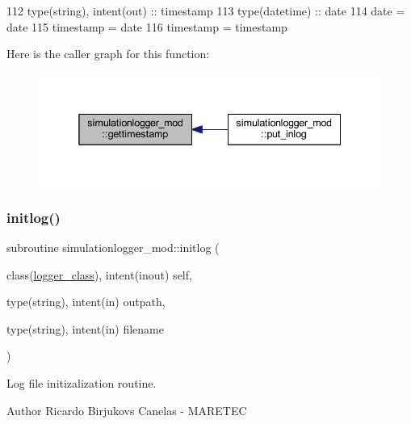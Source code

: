 \begin{DoxyCode}
112     \textcolor{keywordtype}{type}(string), \textcolor{keywordtype}{intent(out)} :: timestamp
113     \textcolor{keywordtype}{type}(datetime) :: date   
114     date = date%
115     timestamp = date%
116     timestamp = timestamp%
\end{DoxyCode}
Here is the caller graph for this function\+:\nopagebreak
\begin{figure}[H]
\begin{center}
\leavevmode
\includegraphics[width=338pt]{namespacesimulationlogger__mod_abff1db7e1655cb59097146d78e650672_icgraph}
\end{center}
\end{figure}
\mbox{\label{namespacesimulationlogger__mod_a7f4423ce42b0a9717110bd78028cec45}} 
\subsubsection{\texorpdfstring{initlog()}{initlog()}}
{\footnotesize\ttfamily subroutine simulationlogger\+\_\+mod\+::initlog (\begin{DoxyParamCaption}\item[{class(\mbox{\hyperlink{structsimulationlogger__mod_1_1logger__class}{logger\+\_\+class}}), intent(inout)}]{self,  }\item[{type(string), intent(in)}]{outpath,  }\item[{type(string), intent(in)}]{filename }\end{DoxyParamCaption})\hspace{0.3cm}{\ttfamily [private]}}



Log file initizalization routine. 

\begin{DoxyAuthor}{Author}
Ricardo Birjukovs Canelas -\/ M\+A\+R\+E\+T\+EC 
\end{DoxyAuthor}

